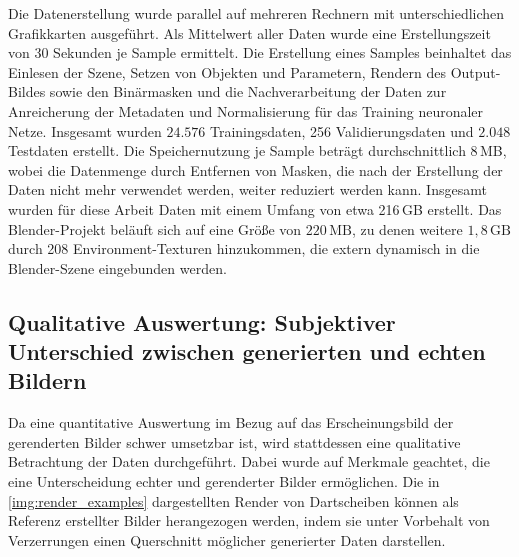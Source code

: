 Die Datenerstellung wurde parallel auf mehreren Rechnern mit unterschiedlichen Grafikkarten ausgeführt. Als Mittelwert aller Daten wurde eine Erstellungszeit von 30 Sekunden je Sample ermittelt. Die Erstellung eines Samples beinhaltet das Einlesen der Szene, Setzen von Objekten und Parametern, Rendern des Output-Bildes sowie den Binärmasken und die Nachverarbeitung der Daten zur Anreicherung der Metadaten und Normalisierung für das Training neuronaler Netze. Insgesamt wurden $24.576$ Trainingsdaten, 256 Validierungsdaten und $2.048$ Testdaten erstellt. Die Speichernutzung je Sample beträgt durchschnittlich 8\,MB, wobei die Datenmenge durch Entfernen von Masken, die nach der Erstellung der Daten nicht mehr verwendet werden, weiter reduziert werden kann. Insgesamt wurden für diese Arbeit Daten mit einem Umfang von etwa 216\,GB erstellt. Das Blender-Projekt beläuft sich auf eine Größe von $220\,\text{MB}$, zu denen weitere $1,8\,\text{GB}$ durch 208 Environment-Texturen hinzukommen, die extern dynamisch in die Blender-Szene eingebunden werden.

\subsection[Qualitative Auswertung]{Qualitative Auswertung: Subjektiver Unterschied zwischen generierten und echten Bildern}  %
\label{sec:rendering_qualitativ}

Da eine quantitative Auswertung im Bezug auf das Erscheinungsbild der gerenderten Bilder schwer umsetzbar ist, wird stattdessen eine qualitative Betrachtung der Daten durchgeführt. Dabei wurde auf Merkmale geachtet, die eine Unterscheidung echter und gerenderter Bilder ermöglichen. Die in \autoref{img:render_examples} dargestellten Render von Dartscheiben können als Referenz erstellter Bilder herangezogen werden, indem sie unter Vorbehalt von Verzerrungen einen Querschnitt möglicher generierter Daten darstellen.

